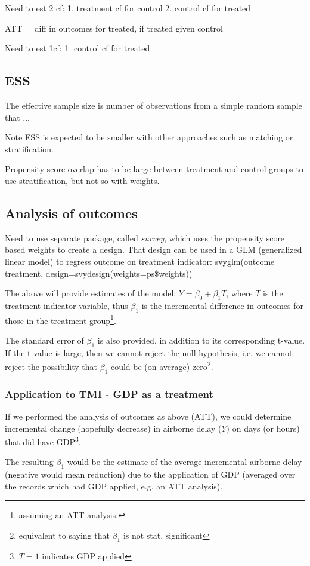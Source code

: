 \documentclass[11pt]{scrartcl}
\begin{document}
Need to est 2 cf:
1. treatment cf for control
2. control cf for treated

ATT = diff in outcomes for treated, if treated given control

Need to est 1cf:
1. control cf for treated

\subsection{ESS}
The effective sample size is number of observations from a simple random sample that ...

Note ESS is expected to be smaller with other approaches such as matching or stratification.  

Propensity score overlap has to be large between treatment and control groups to use stratification, but not so with weights.

\subsection{Analysis of outcomes}
Need to use separate package, called \emph{survey}, which uses the propensity score based weights to create a design.  That design can be used in a GLM (generalized linear model) to regress outcome on treatment indicator:
svyglm(outcome ~ treatment, design=svydesign(weights=ps\$weights))
 
The above will provide estimates of the model: $Y=\beta_0+\beta_1 T$, where $T$ is the treatment indicator variable, thus $\beta_1$ is the incremental difference in outcomes for those in the treatment group\footnote{assuming an ATT analysis.}.  

The standard error of $\beta_1$ is also provided, in addition to its corresponding t-value.  If the t-value is large, then we cannot reject the null hypothesis, i.e. we cannot reject the possibility that $\beta_1$ could be (on average) zero\footnote{equivalent to saying that $\beta_1$ is not stat. significant}.

\subsubsection{Application to TMI - GDP as a treatment}
If we performed the analysis of outcomes as above (ATT), we could determine incremental change (hopefully decrease) in airborne delay ($Y$) on days (or hours) that did have GDP\footnote{$T=1$ indicates GDP applied}.    

The resulting $\beta_1$ would be the estimate of the average incremental airborne delay (negative would mean reduction) due to the application of GDP (averaged over the records which had GDP applied, e.g. an ATT analysis).  
\end{document}
